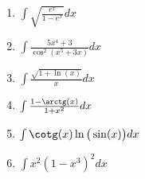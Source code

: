 \begin{exercice}
\begin{multicols}{3}
\begin{enumerate}
\item
$\int \sqrt{\frac{ e^x }{ 1-e^x }} dx$
\item
$\int \frac{ 5x^4+3 }{ \cos^2(x^5+3x) } dx$
\item
$\int \frac{ \sqrt{1+\ln(x)} }{ x } dx$
\item
$\int \frac{ 1-\arctg(x) }{ 1+x^2 } dx$
\item
$\int \cotg(x)\ln\big( \sin(x) \big) dx$
\item
$\int x^2(1-x^3)^2 dx$


\end{enumerate}
\end{multicols}

\end{exercice}

